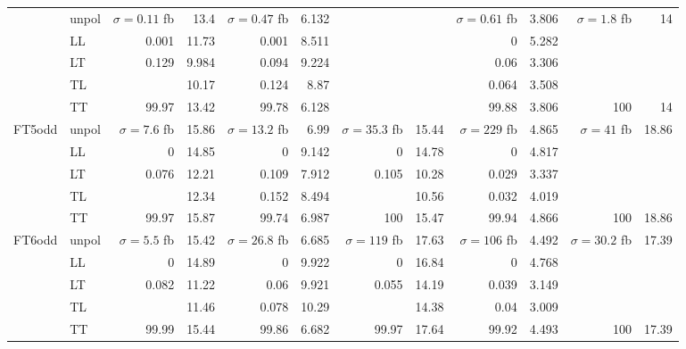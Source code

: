 \begin{table}[h]
{\begin{tabular}{llrrrrrrrrrr}
 & unpol & $\sigma = \num{0.11}$ fb & \num{13.4} & $\sigma = \num{0.47}$ fb & \num{6.132} &  &  & $\sigma = \num{0.61}$ fb & \num{3.806} & $\sigma = \num{1.8}$ fb & \num{14} \\
 & LL & \num{0.001} & \num{11.73} & \num{0.001} & \num{8.511} &  &  & \num{0} & \num{5.282} &  &  \\
 & LT & \num{0.129} & \num{9.984} & \num{0.094} & \num{9.224} &  &  & \num{0.06} & \num{3.306} &  &  \\
 & TL &  & \num{10.17} & \num{0.124} & \num{8.87} &  &  & \num{0.064} & \num{3.508} &  &  \\
 & TT & \num{99.97} & \num{13.42} & \num{99.78} & \num{6.128} &  &  & \num{99.88} & \num{3.806} & \num{100} & \num{14} \\
\midrule
\multirow{5}{*}{FT5odd}
 & unpol & $\sigma = \num{7.6}$ fb & \num{15.86} & $\sigma = \num{13.2}$ fb & \num{6.99} & $\sigma = \num{35.3}$ fb & \num{15.44} & $\sigma = \num{229}$ fb & \num{4.865} & $\sigma = \num{41}$ fb & \num{18.86} \\
 & LL & \num{0} & \num{14.85} & \num{0} & \num{9.142} & \num{0} & \num{14.78} & \num{0} & \num{4.817} &  &  \\
 & LT & \num{0.076} & \num{12.21} & \num{0.109} & \num{7.912} & \num{0.105} & \num{10.28} & \num{0.029} & \num{3.337} &  &  \\
 & TL &  & \num{12.34} & \num{0.152} & \num{8.494} &  & \num{10.56} & \num{0.032} & \num{4.019} &  &  \\
 & TT & \num{99.97} & \num{15.87} & \num{99.74} & \num{6.987} & \num{100} & \num{15.47} & \num{99.94} & \num{4.866} & \num{100} & \num{18.86} \\
\midrule
\multirow{5}{*}{FT6odd}
 & unpol & $\sigma = \num{5.5}$ fb & \num{15.42} & $\sigma = \num{26.8}$ fb & \num{6.685} & $\sigma = \num{119}$ fb & \num{17.63} & $\sigma = \num{106}$ fb & \num{4.492} & $\sigma = \num{30.2}$ fb & \num{17.39} \\
 & LL & \num{0} & \num{14.89} & \num{0} & \num{9.922} & \num{0} & \num{16.84} & \num{0} & \num{4.768} &  &  \\
 & LT & \num{0.082} & \num{11.22} & \num{0.06} & \num{9.921} & \num{0.055} & \num{14.19} & \num{0.039} & \num{3.149} &  &  \\
 & TL &  & \num{11.46} & \num{0.078} & \num{10.29} &  & \num{14.38} & \num{0.04} & \num{3.009} &  &  \\
 & TT & \num{99.99} & \num{15.44} & \num{99.86} & \num{6.682} & \num{99.97} & \num{17.64} & \num{99.92} & \num{4.493} & \num{100} & \num{17.39} \\
\bottomrule
\end{tabular}
}%
\end{table}